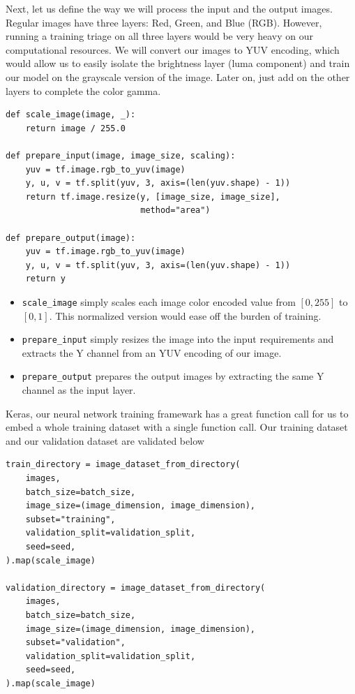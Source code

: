 \documentclass[12pt]{article}
\begin{document}
Next, let us define the way we will process the input and the output images. Regular
images have three layers: Red, Green, and Blue (RGB). However, running a training
triage on all three layers would be very heavy on our computational resources. We
will convert our images to YUV encoding, which would allow us to easily isolate the
brightness layer (luma component) and train our model on the grayscale version of the
image. Later on, just add on the other layers to complete the color gamma.

\begin{verbatim}
def scale_image(image, _):
    return image / 255.0

def prepare_input(image, image_size, scaling):
    yuv = tf.image.rgb_to_yuv(image)
    y, u, v = tf.split(yuv, 3, axis=(len(yuv.shape) - 1))
    return tf.image.resize(y, [image_size, image_size],
                           method="area")

def prepare_output(image):
    yuv = tf.image.rgb_to_yuv(image)
    y, u, v = tf.split(yuv, 3, axis=(len(yuv.shape) - 1))
    return y

\end{verbatim}

\begin{itemize}
\item \texttt{scale\_image} simply scales each image color encoded value from \([0,255]\) to \([0,1]\).
This normalized version would ease off the burden of training.
\item \texttt{prepare\_input} simply resizes the image into the input requirements and extracts the
Y channel from an YUV encoding of our image.
\item \texttt{prepare\_output} prepares the output images by extracting the same Y channel as the
input layer.
\end{itemize}

Keras, our neural network training framewark has a great function call for us to embed
a whole training dataset with a single function call. Our training dataset and our
validation dataset are validated below

\begin{verbatim}
train_directory = image_dataset_from_directory(
    images,
    batch_size=batch_size,
    image_size=(image_dimension, image_dimension),
    subset="training",
    validation_split=validation_split,
    seed=seed,
).map(scale_image)

validation_directory = image_dataset_from_directory(
    images,
    batch_size=batch_size,
    image_size=(image_dimension, image_dimension),
    subset="validation",
    validation_split=validation_split,
    seed=seed,
).map(scale_image)

\end{verbatim}
\end{document}
